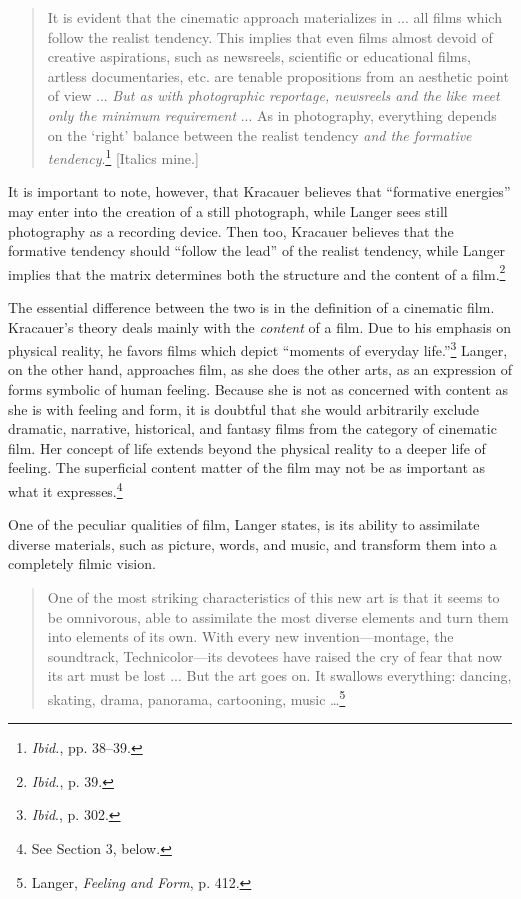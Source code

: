\documentclass{tufte-handout}
\begin{document}
\begin{quote}
It is evident that the cinematic approach materializes in ... all films
which follow the realist tendency. This implies that even films almost
devoid of creative aspirations, such as newsreels, scientific or
educational films, artless documentaries, etc. are tenable propositions
from an aesthetic point of view ... \emph{But as with photographic
reportage, newsreels and the like meet only the minimum requirement} ...
As in photography, everything depends on the `right' balance between the
realist tendency \emph{and the formative tendency}.\footnote{\emph{Ibid.},
  pp. 38--39.} {[}Italics mine.{]}
\end{quote}

\noindent It is important to note, however, that Kracauer believes that
``formative energies'' may enter into the creation of a still
photograph, while Langer sees still photography as a recording device.
Then too, Kracauer believes that the formative tendency should ``follow
the lead'' of the realist tenden­cy, while Langer implies that the matrix
determines both the structure and the content of a film.\footnote{\emph{Ibid.},
  p. 39.}

The essential difference between the two is in the definition of a
cine­matic film. Kracauer's theory deals mainly with the \emph{content}
of a film. Due to his emphasis on physical reality, he favors films
which depict ``moments of everyday life.''\footnote{\emph{Ibid}., p.
  302.} Langer, on the other hand, approaches film, as she does the
other arts, as an expression of forms symbolic of human feeling. Be­cause
she is not as concerned with content as she is with feeling and form, it
is doubtful that she would arbitrarily exclude dramatic, narrative,
historical, and fantasy films from the category of cinematic film. Her
concept of life extends beyond the physical reality to a deeper life of
feeling. The superficial content matter of the film may not be as
important as what it expresses.\footnote{See Section 3, below.}

One of the peculiar qualities of film, Langer states, is its ability to
as­similate diverse materials, such as picture, words, and music, and
transform them into a completely filmic vision.

\begin{quote}
One of the most striking characteristics of this new art is that it
seems to be omnivorous, able to assimilate the most diverse elements and
turn them into elements of its own. With every new invention---montage,
the soundtrack, Technicolor---its devotees have raised the cry of fear
that now its art must be lost ... But the art goes on. It swallows
everything: dancing, skating, drama, panorama, cartooning, music
\ldots{}\footnote{Langer, \emph{Feeling and Form}, p. 412.}
\end{quote}
\end{document}
